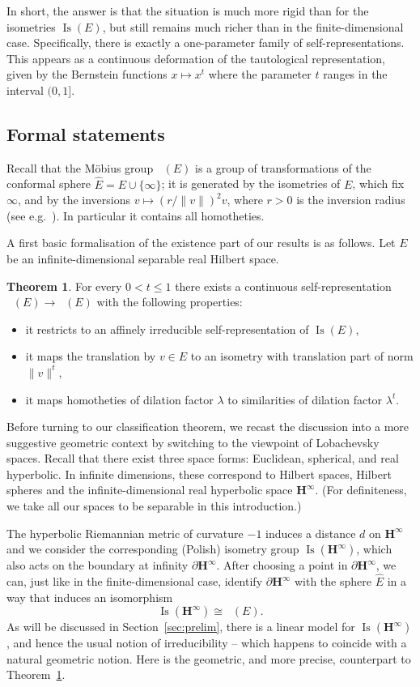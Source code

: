\documentclass[11pt]{article}
\theoremstyle{definition}
\numberwithin{equation}{section}
\numberwithin{figure}{section}
\numberwithin{table}{section}
\newtheorem{imain}{Theorem}
\newcommand{\HHI}{\mathbf{H}^{\infty}}
\newcommand{\Isomi}{{\Isom}(\HHI)}
\DeclareMathOperator{\Isom}{Is}
\DeclareMathOperator{\Mob}{M\ddot{o}b}
\begin{document}
In short, the answer is that the situation is much more rigid than for the isometries $\Isom(E)$, but still remains much richer than in the finite-dimensional case. Specifically, there is exactly a one-parameter family of self-representations. This appears as a continuous deformation of the tautological representation, given by the Bernstein functions $x\mapsto x^t$ where the parameter $t$ ranges in the interval $(0, 1]$.

\subsection{Formal statements}

Recall that the M\"obius group $\Mob(E)$ is a group of transformations of the conform\-al sphere $\widehat E = E\cup\{\infty\}$; it is generated by the isometries of $E$, which fix $\infty$, and by the inversions $v \mapsto (r/\|v\|)^2 v$, where $r>0$ is the inversion radius (see e.g.~\cite[I.3]{Reshetnyak}). In particular it contains all homotheties.

A first basic formalisation of the existence part of our results is as follows. Let $E$ be an infinite-dimensional separable real Hilbert space.

\begin{imain}\label{thm:Mobnew}
For every $0<t\leq 1$ there exists a continuous self-representation $\Mob(E)\to \Mob(E)$ with the following properties:
\begin{itemize}
\item it restricts to an affinely irreducible self-representation of $\Isom(E)$,
\item it maps the translation by $v\in E$ to an isometry with translation part of norm $\|v\|^t$,
\item it maps homotheties of dilation factor $\lambda$ to similarities of dilation factor $\lambda^t$.
\end{itemize}
\end{imain}

Before turning to our classification theorem, we recast the discussion into a more suggestive geometric context by switching to the viewpoint of Lobachevsky spaces. Recall that there exist three space forms: Euclidean, spherical, and real hyperbolic. In infinite dimensions, these correspond to Hilbert spaces, Hilbert spheres and the infinite-dimensional real hyperbolic space $\HHI$. (For definiteness, we take all our spaces to be separable in this introduction.)

The hyperbolic Riemannian metric of curvature $-1$ induces a distance $d$ on $\HHI$ and we consider the corresponding (Polish) isometry group $\Isomi$, which also acts on the boundary at infinity $\partial \HHI$. After choosing a point in $\partial \HHI$, we can, just like in the finite-dimensional case, identify $\partial \HHI$ with the sphere $\widehat E$ in a way that induces an isomorphism
\[
\Isomi\cong \Mob(E).
\]
As will be discussed in Section~\ref{sec:prelim}, there is a linear model for $\Isomi$, and hence the usual notion of irreducibility -- which happens to coincide with a natural geometric notion. Here is the geometric, and more precise, counterpart to Theorem~\ref{thm:Mobnew}.
\end{document}
